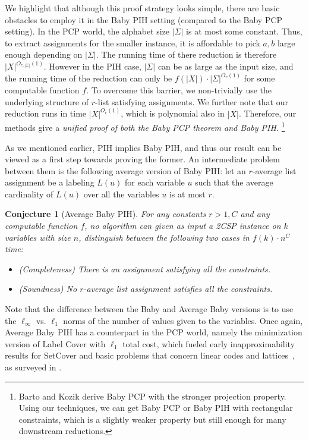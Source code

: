 \documentclass[10pt,a4paper]{article}
\newtheorem{conjecture}[theorem]{Conjecture}
\begin{document}
We highlight that although this proof strategy looks simple, there are basic obstacles to employ it in the Baby PIH setting (compared to the Baby PCP setting). In the PCP world, the alphabet size $|\Sigma|$ is at most some constant. Thus, to extract assignments for the smaller instance, it is affordable to pick $a,b$ large enough depending on $|\Sigma|$. The running time of there reduction is therefore $|X|^{O_{r,|\Sigma|}(1)}$. However in the PIH case, $|\Sigma|$ can be as large as the input size, and the running time of the reduction can only be $f(|X|)\cdot |\Sigma|^{O_r(1)}$ for some computable function $f$. To overcome this barrier, we non-trivially use the underlying structure of $r$-list satisfying assignments. We further note that our reduction runs in time $|X|^{O_r(1)}$, which is polynomial also in $|X|$. Therefore, our methods give a \emph{unified proof of both the Baby PCP theorem and Baby PIH.} \footnote{Barto and Kozik \cite{BK22} derive Baby PCP with the stronger projection property. Using our techniques, we can get Baby PCP or Baby PIH with rectangular constraints, which is a slightly weaker property but still enough for many downstream reductions.}

As we mentioned earlier, PIH implies Baby PIH, and thus our result can be viewed as a first step towards proving the former. An intermediate problem between them is the following average version of Baby PIH: let an $r$-average list assignment be a labeling $L(u)$ for each variable $u$ such that the average cardinality of $L(u)$ over all the variables $u$ is at most $r$. 
\begin{conjecture}[Average Baby PIH]
For any constants $r >1,C$ and any computable function $f$, no algorithm can given as input a 2CSP instance on $k$ variables with size $n$, distinguish between the following two cases in $f(k)\cdot n^{C}$ time:
    \begin{itemize}
        \item (Completeness) There is an assignment satisfying all the constraints.
        \item (Soundness) No $r$-average list assignment satisfies all the constraints.
    \end{itemize}
\end{conjecture}

Note that the difference between the Baby and Average Baby versions is to use the $\ell_\infty$ vs. $\ell_1$ norms of the number of values given to the variables.
Once again, Average Baby PIH has a counterpart in the PCP world, namely the minimization version of Label Cover with $\ell_1$ total cost, which fueled early inapproximability results for {\sc SetCover} and basic problems that concern linear codes and lattices~\cite{ABSS97}, as surveyed in \cite{AL96}. 
\end{document}

